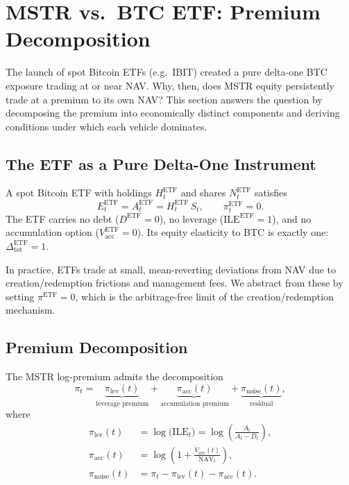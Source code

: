 \section{MSTR vs.\ BTC ETF: Premium Decomposition}\label{sec:etf-comparison}

The launch of spot Bitcoin ETFs (e.g.\ IBIT) created a pure delta-one
BTC exposure trading at or near NAV.  Why, then, does MSTR equity
persistently trade at a premium to its own NAV?  This section answers
the question by decomposing the premium into economically distinct
components and deriving conditions under which each vehicle dominates.

\subsection{The ETF as a Pure Delta-One Instrument}

\begin{definition}\label{def:etf}
A spot Bitcoin ETF with holdings $H_t^{\mathrm{ETF}}$ and shares
$N_t^{\mathrm{ETF}}$ satisfies
$$
  E_t^{\mathrm{ETF}}
  = A_t^{\mathrm{ETF}}
  = H_t^{\mathrm{ETF}}\,S_t,
  \qquad
  \pi_t^{\mathrm{ETF}} = 0.
$$
The ETF carries no debt ($D^{\mathrm{ETF}} = 0$), no leverage
($\mathrm{ILE}^{\mathrm{ETF}} = 1$), and no accumulation option
($V_{\mathrm{acc}}^{\mathrm{ETF}} = 0$).
Its equity elasticity to BTC is exactly one:
$\Delta_{\mathrm{tot}}^{\mathrm{ETF}} = 1$.
\end{definition}

\begin{remark}
In practice, ETFs trade at small, mean-reverting deviations from NAV due
to creation/redemption frictions and management fees.  We abstract from
these by setting $\pi^{\mathrm{ETF}} = 0$, which is the arbitrage-free
limit of the creation/redemption mechanism.
\end{remark}

\subsection{Premium Decomposition}

\begin{theorem}\label{thm:decomposition}
The MSTR log-premium admits the decomposition
$$
  \pi_t
  = \underbrace{\pi_{\mathrm{lev}}(t)}_{\text{leverage premium}}
  + \underbrace{\pi_{\mathrm{acc}}(t)}_{\text{accumulation premium}}
  + \underbrace{\pi_{\mathrm{noise}}(t)}_{\text{residual}},
$$
where
\begin{align}
  \pi_{\mathrm{lev}}(t)
  &= \log\!\bigl(\mathrm{ILE}_t\bigr)
  = \log\!\left(\frac{A_t}{A_t - D_t}\right), \label{eq:pi-lev} \\[6pt]
  \pi_{\mathrm{acc}}(t)
  &= \log\!\left(1 + \frac{V_{\mathrm{acc}}(t)}{\mathrm{NAV}_t}\right), \label{eq:pi-acc} \\[6pt]
  \pi_{\mathrm{noise}}(t)
  &= \pi_t - \pi_{\mathrm{lev}}(t) - \pi_{\mathrm{acc}}(t). \label{eq:pi-noise}
\end{align}
\end{theorem}


